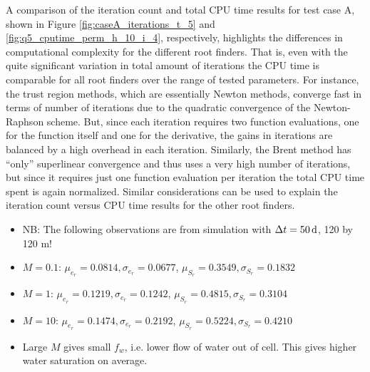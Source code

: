 A comparison of the iteration count and total CPU time results for test case A, shown in Figure \ref{fig:caseA_iterations_t_5} and \ref{fig:q5_cputime_perm_h_10_i_4}, respectively, highlights the differences in computational complexity for the different root finders. That is, even with the quite significant variation in total amount of iterations the CPU time is comparable for all root finders over the range of tested parameters. For instance, the trust region methods, which are essentially Newton methods, converge fast in terms of number of iterations due to the quadratic convergence of the Newton-Raphson scheme. But, since each iteration requires two function evaluations, one for the function itself and one for the derivative, the gains in iterations are balanced by a high overhead in each iteration. Similarly, the Brent method has ``only'' superlinear convergence and thus uses a very high number of iterations, but since it requires just one function evaluation per iteration the total CPU time spent is again normalized. Similar considerations can be used to explain the iteration count versus CPU time results for the other root finders.

\begin{itemize}
\item NB: The following observations are from simulation with $\Delta t = \unit[50]{d}$, 120 by 120 m!
\item $M = 0.1$: $\mu_{e_r} = 0.0814, \sigma_{e_r} = 0.0677$, $\mu_{S_r} = 0.3549, \sigma_{S_r} = 0.1832$
\item $M = 1$: $\mu_{e_r} = 0.1219, \sigma_{e_r} = 0.1242$, $\mu_{S_r} = 0.4815, \sigma_{S_r} = 0.3104$
\item $M = 10$: $\mu_{e_r} = 0.1474, \sigma_{e_r} = 0.2192$, $\mu_{S_r} = 0.5224, \sigma_{S_r} = 0.4210$
\item Large $M$ gives small $f_w$, i.e. lower flow of water out of cell. This gives higher water saturation on average.
\end{itemize}


